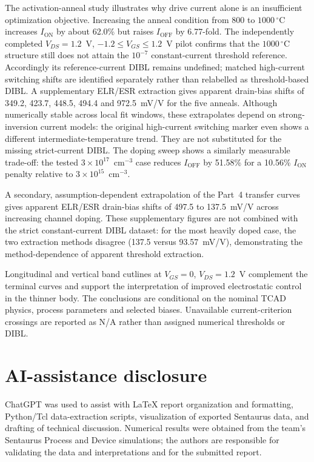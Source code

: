 \documentclass[11pt,a4paper]{article}
\begin{document}
The activation-anneal study illustrates why drive current
alone is an insufficient optimization objective. Increasing
the anneal condition from $800$ to $1000\,^\circ$C
increases $I_{\mathrm{ON}}$ by about 62.0\% but raises
$I_{\mathrm{OFF}}$ by 6.77-fold. The independently
completed $V_{DS}=1.2$~V, $-1.2\leq V_{GS}\leq1.2$~V
pilot confirms that the $1000\,^\circ$C structure
still does not attain the $10^{-7}$ constant-current
threshold reference. Accordingly its reference-current
DIBL remains undefined; matched high-current switching
shifts are identified separately rather than relabelled
as threshold-based DIBL.
A supplementary ELR/ESR extraction gives apparent
drain-bias shifts of 349.2, 423.7, 448.5,
494.4 and 972.5~mV/V for the five anneals.
Although numerically stable across local fit windows,
these extrapolates depend on strong-inversion current
models: the original high-current switching marker
even shows a different intermediate-temperature trend.
They are not substituted for the missing strict-current DIBL. The doping sweep shows a
similarly measurable trade-off: the tested
$3\times10^{17}$~cm$^{-3}$ case reduces
$I_{\mathrm{OFF}}$ by 51.58\% for a 10.56\%
$I_{\mathrm{ON}}$ penalty relative to
$3\times10^{15}$~cm$^{-3}$.

A secondary, assumption-dependent extrapolation of the
Part~4 transfer curves gives apparent ELR/ESR drain-bias shifts
of 497.5 to 137.5~mV/V across increasing channel doping.
These supplementary figures are not combined with the
strict constant-current DIBL dataset: for the most
heavily doped case, the two extraction methods disagree
(137.5 versus 93.57~mV/V), demonstrating the
method-dependence of apparent threshold extraction.


Longitudinal and vertical band cutlines at
$V_{GS}=0$, $V_{DS}=1.2$~V complement the terminal
curves and support the interpretation of improved
electrostatic control in the thinner body.
The conclusions are conditional on the nominal
TCAD physics, process parameters and selected biases.
Unavailable current-criterion crossings are reported
as N/A rather than assigned numerical thresholds or DIBL.

\section*{AI-assistance disclosure}
ChatGPT was used to assist with LaTeX report organization and formatting,
Python/Tcl data-extraction scripts, visualization of exported Sentaurus
data, and drafting of technical discussion. Numerical results were
obtained from the team's Sentaurus Process and Device simulations;
the authors are responsible for validating the data and interpretations
and for the submitted report.
\end{document}
